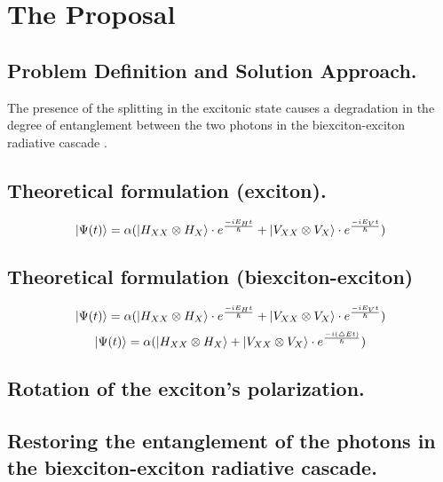 \section{The Proposal}
\subsection{Problem Definition and Solution Approach.}
The presence of the splitting in the excitonic state causes a degradation in the degree of entanglement between the two photons in the biexciton-exciton radiative cascade \cite{Winik2017}.      
\subsection{Theoretical formulation (exciton).}
\begin{equation}
	\ket{\Psi(t)} = \alpha(\ket{H_{XX} \otimes  H_X}\cdot e^{\frac{-iE_H t}{\hslash}}+\ket{V_{XX}\otimes V_X}\cdot e^{\frac{-iE_Vt}{\hslash}})
\end{equation}
\subsection{Theoretical formulation (biexciton-exciton)}
	\begin{equation}
	\ket{\Psi(t)} = \alpha(\ket{H_{XX} \otimes  H_X}\cdot e^{\frac{-iE_H t}{\hslash}}+\ket{V_{XX}\otimes V_X}\cdot e^{\frac{-iE_Vt}{\hslash}})
	\end{equation}
\begin{equation}
	\ket{\Psi(t)} = \alpha(\ket{H_{XX} \otimes H_X}+\ket{V_{XX}\otimes V_X}\cdot e^{\frac{-i(\triangle Et)}{\hslash}})
\end{equation}
\subsection{Rotation of the exciton's polarization.}
\subsection{Restoring the entanglement of the photons in the biexciton-exciton radiative cascade.}

